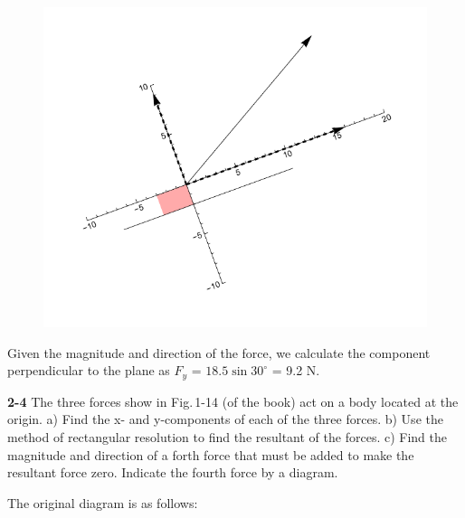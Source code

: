 \documentclass{amsart}
\begin{document}
\begin{figure}[h]
\includegraphics[scale=0.6]{2-3}
\end{figure}

Given the magnitude and direction of the force, we calculate the component perpendicular
to the plane as $F_y$ = $18.5 \sin 30^\circ$ = 9.2 N.

\vspace{\baselineskip}

\noindent
\textbf{2-4} The three forces show in Fig.\,1-14 (of the book) act on a body located at the origin.\newline
a) Find the x- and y-components of each of the three forces.\newline
b) Use the method of rectangular resolution to find the resultant of the forces.\newline
c) Find the magnitude and direction of a forth force that must be added to make the resultant force zero.
Indicate the fourth force by a diagram.

\clearpage
The original diagram is as follows:
\end{document}
